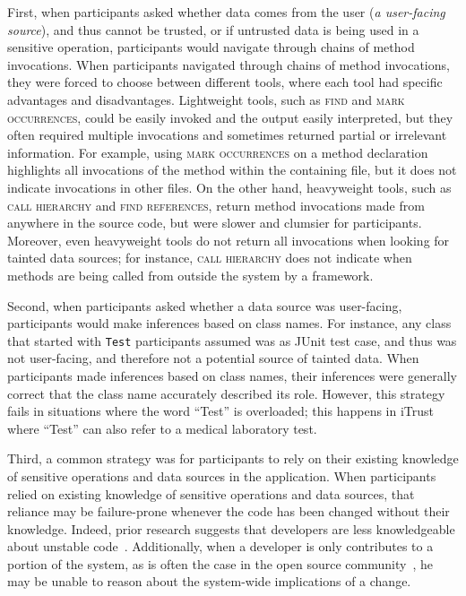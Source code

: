 \documentclass{acm_proc_article-sp}
\begin{document}
First, when participants asked whether data comes from the user (\emph{a user-facing source}), 
and thus cannot be trusted, or if untrusted data is being used in a sensitive operation,
participants would navigate through chains of method invocations.
When participants navigated through chains of method invocations,
they were forced to choose between different tools, where each tool
had specific advantages and disadvantages.
Lightweight tools, such as \textsc{find} and \textsc{mark occurrences}, could be easily invoked and the output
easily interpreted, but they often required multiple invocations and sometimes returned 
partial or irrelevant information.
For example, using \textsc{mark occurrences} on a method declaration highlights all invocations of the method 
within the containing file, but it does not indicate invocations in other files.
On the other hand, heavyweight tools, such as \textsc{call hierarchy} and \textsc{find references}, 
return method invocations made from anywhere in the source code, but were slower and clumsier for participants.
Moreover, even heavyweight tools do not return all invocations when looking for tainted data sources;
for instance, \textsc{call hierarchy} does not indicate when methods are being called from outside the system
by a framework.

Second, when participants asked whether a data source was user-facing,
participants would make inferences based on class names.
For instance, any class that started with \texttt{Test} participants assumed was as JUnit test case,
and thus was not user-facing, and therefore not a potential source of tainted data.
When participants made inferences based on class names,
their inferences were generally correct that the class name accurately described
its role.
However, this strategy
fails in situations where the word ``Test'' is overloaded;
this happens in iTrust where ``Test'' can also refer to 
a medical laboratory test.

Third, a common strategy was for
participants to rely on their existing knowledge of sensitive operations and data sources in the application.
When participants relied on existing knowledge of sensitive operations and data sources,
that reliance may be failure-prone whenever the code has been changed without their knowledge.
Indeed, prior research suggests that developers are 
less knowledgeable about unstable code~\cite{fritz2014degree}. 
Additionally, when a developer is only contributes to a portion of the system, as is often the case in the open source community~\cite{mockus2002open}, he may be unable to reason about the system-wide implications of a change. 
\end{document}
